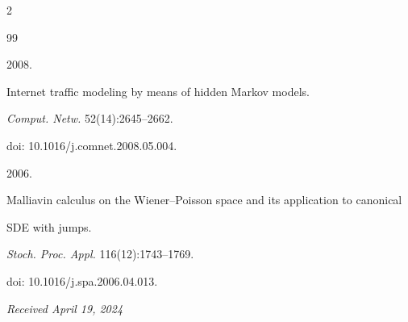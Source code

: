 \begin{multicols}{2}
{{\begin{thebibliography}{99}




 2008.


Internet traffic modeling by means of hidden Markov models. 


\textit{Comput. Netw.} 52(14):2645--2662.


doi: 10.1016/j.\linebreak comnet.2008.05.004.









 2006. 


Malliavin calculus on the Wiener--Poisson space and its application to canonical 


SDE with jumps. 


\textit{Stoch. Proc. Appl.} 116(12):1743--1769.


doi: 10.1016/j.spa.2006.04.013.





\end{thebibliography}





 }


 }





\end{multicols}





\vspace*{-6pt}





\hfill{\small\textit{Received April 19, 2024}} 





\vspace*{-18pt}





\Contr





\vspace*{-3pt}





